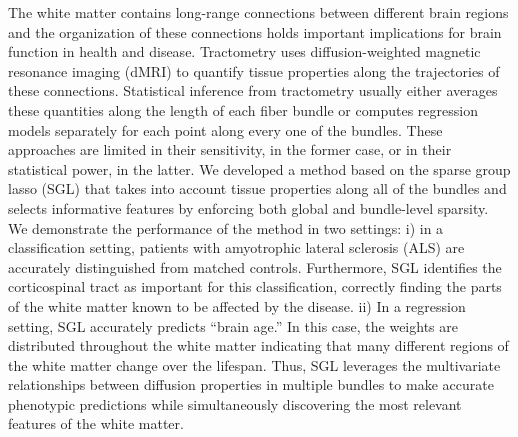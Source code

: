 \documentclass[10pt,letterpaper]{article}
\begin{document}
The white matter contains long-range connections between different brain
regions and the organization of these connections holds important
implications for brain function in health and disease. Tractometry uses
diffusion-weighted magnetic resonance imaging (dMRI) to quantify tissue
properties along the trajectories of these connections.
Statistical inference from tractometry usually either averages these
quantities along the length of each fiber bundle or computes regression
models separately for each point along every one of the bundles. These
approaches are limited in their sensitivity, in the former case, or in
their statistical power, in the latter. We developed a method based on
the sparse group lasso (SGL)
that takes into account tissue properties along all of the bundles and
selects informative features by enforcing both global and bundle-level
sparsity. We demonstrate the performance of the method in two settings:
i) in a classification setting, patients with amyotrophic lateral
sclerosis (ALS) are accurately distinguished from matched controls.
Furthermore, SGL identifies the corticospinal tract as important for this
classification, correctly finding the parts of the white matter known to
be affected by the disease. ii) In a regression setting, SGL accurately
predicts ``brain age.''
In this case, the weights are distributed throughout the white matter
indicating that many different regions of the white matter change over
the lifespan. Thus, SGL leverages the multivariate relationships between
diffusion properties in multiple bundles to make accurate phenotypic
predictions while simultaneously discovering the most relevant features
of the white matter.

\end{document}
